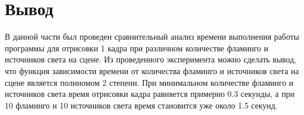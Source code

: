 \section*{Вывод}

В данной части был проведен сравнительный анализ времени выполнения работы программы для отрисовки 1 кадра при различном количестве фламинго и источников света на сцене. Из проведенного эксперимента можно сделать вывод, что функция зависимости времени от количества фламинго и источников света на сцене является полиномом 2 степени. При минимальном количестве фламинго и источников света время отрисовки кадра равняется примерно 0.3 секунды, а при 10 фламинго и 10 источников света время становится уже около 1.5 секунд.